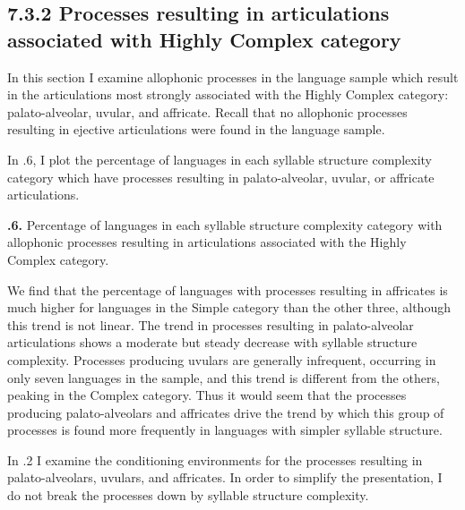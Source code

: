 \subsection{7.3.2 Processes resulting in articulations associated with Highly Complex category}

  In this section I examine allophonic processes in the language sample which result in the articulations most strongly associated with the Highly Complex category: palato-alveolar, uvular, and affricate. Recall that no allophonic processes resulting in ejective articulations were found in the language sample.

  In .6, I plot the percentage of languages in each syllable structure complexity category which have processes resulting in palato-alveolar, uvular, or affricate articulations.

\textbf{.6.} Percentage of languages in each syllable structure complexity category with allophonic processes resulting in articulations associated with the Highly Complex category.

  We find that the percentage of languages with processes resulting in affricates is much higher for languages in the Simple category than the other three, although this trend is not linear. The trend in processes resulting in palato-alveolar articulations shows a moderate but steady decrease with syllable structure complexity. Processes producing uvulars are generally infrequent, occurring in only seven languages in the sample, and this trend is different from the others, peaking in the Complex category. Thus it would seem that the processes producing palato-alveolars and affricates drive the trend by which this group of processes is found more frequently in languages with simpler syllable structure.

  In .2 I examine the conditioning environments for the processes resulting in palato-alveolars, uvulars, and affricates. In order to simplify the presentation, I do not break the processes down by syllable structure complexity.

